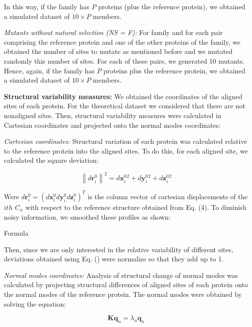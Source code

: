 \documentclass{article}
\begin{document}
In this way, if the family has $P$ proteins (plus the reference protein), we obtained a simulated dataset of $10 \times P$  members. 

{\it Mutants without natural selection (NS = F):} For family and for each pair comprising the reference protein and one of the other proteins of the family, we obtained the number of sites to mutate as mentioned before and we mutated randomly this number of sites. For each of these pairs, we generated 10 mutants. Hence, again, if the family has $P$ proteins plus the reference protein, we obtained a simulated dataset of  $10 \times P$  members.

{\bf Structural variability measures:}
We obtained the coordinates of the aligned sites of each protein. For the theoretical dataset we considered that there are not nonaligned sites. Then, structural variability measures were calculated in Cartesian coordinates and projected onto the normal modes coordinates:

{\it Cartesian coordinates:}
Structural variation of each protein was calculated relative to the reference protein into the aligned sites. To do this, for each aligned site, we calculated the square deviation:
 
\begin{equation}
\left\|d\mathbf{r}^{0}_{i}\right\|^{2}=d\mathbf{x}^{0}_{i}^{2}+d\mathbf{y}^{0}_{i}^{2}+d\mathbf{z}^{0}_{i}^{2}
\end{equation}

Were $d\mathbf{r}^{0}_{i}=(d\mathbf{x}^{0}_{i}d\mathbf{y}^{0}_{i}d\mathbf{z}^{0}_{i})^{T}$ is the column vector of cartesian displacements of the $ith$ $C_{\alpha}$ with respect to the reference structure obtained from Eq. (4). To diminish noisy information, we smoothed these profiles as shown:

Formula 

Then, since we are only interested in the relative variability of different sites, deviations obtained using Eq. () were normalize so that they add up to 1.

{\it Normal modes coordinates:}
Analysis of structural change of normal modes was calculated by projecting structural differences of aligned sites of each protein onto the normal modes of the reference protein. The normal modes were obtained by solving the equation:
  
\begin{equation}
\mathbf{K}\mathbf{q}_{n} = \lambda_{n}\mathbf{q}_{n} 
\end{equation}
\end{document}
